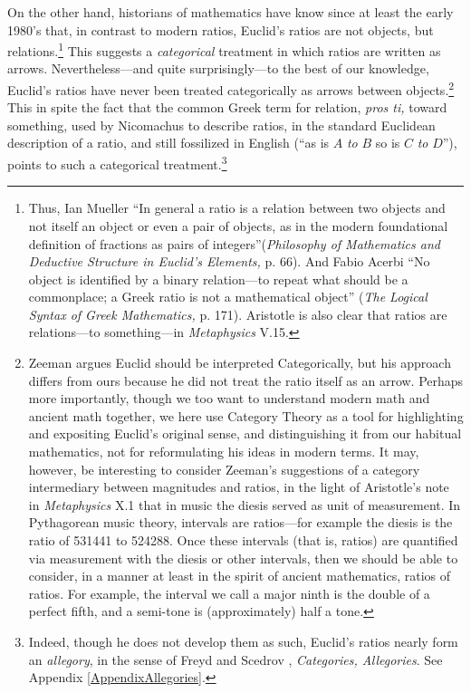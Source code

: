 \documentclass[11pt]{article}
\begin{document}
On the other hand, historians of mathematics have know since at least the early 1980's that, in contrast to modern ratios, Euclid's ratios are not objects, but relations.\footnote{Thus, Ian Mueller \protect\citep{mueller1981} ``In general a ratio is a relation between two objects and not itself an object or even a pair of objects, as in the modern foundational definition of fractions as pairs of integers''(\textit{Philosophy of Mathematics and Deductive Structure in
Euclid's \emph{Elements,}} p. 66). And Fabio Acerbi \protect\citep{acerbi2021} ``No object is identified by a binary relation---to repeat what should be a commonplace; a Greek ratio is not a mathematical object'' (\textit{The Logical Syntax of Greek Mathematics,} p. 171). Aristotle \cite{aristotle-meta} is also clear that ratios are relations---to something---in \textit{Metaphysics} V.15.} This suggests a \textit{categorical} treatment  in which ratios are written as arrows. Nevertheless---and quite surprisingly---to the best of our knowledge, Euclid's ratios have never been treated categorically as arrows between objects.\footnote{Zeeman \citep{zeeman1977} argues Euclid should be interpreted Categorically, but his approach differs from ours because he did not treat the ratio itself as an arrow. Perhaps more importantly, though we too want to understand modern math and ancient math together, we here use Category Theory as a tool for highlighting and expositing Euclid's original sense, and distinguishing it from our habitual mathematics, not for reformulating his ideas in modern terms. It may, however, be interesting to consider Zeeman's suggestions of a category intermediary between magnitudes and ratios, in the light of Aristotle's note in \textit{Metaphysics} X.1 that in music the diesis served as unit of measurement. In Pythagorean music theory, intervals are ratios---for example the diesis is the ratio of 531441 to 524288. Once these intervals (that is, ratios) are quantified via measurement with the diesis or other intervals, then we should be able to consider, in a manner at least in the spirit of ancient mathematics, ratios of ratios. For example, the interval we call a major ninth is the double of a perfect fifth, and a semi-tone is (approximately) half a tone.} This in spite the fact that the common Greek term for relation, \textit{pros ti,} toward something, used by Nicomachus to describe ratios, in the standard Euclidean description of a ratio, and still fossilized in English (``as is $A$ \textit{to} $B$ so is $C$ \textit{to} $D$''), points to such a categorical treatment.\footnote{Indeed, though he does not develop them as such, Euclid's ratios nearly form an \textit{allegory}, in the sense of Freyd and Scedrov \protect\citep{freyd-scedrov1990}, \textit{Categories, Allegories}. See Appendix \ref{AppendixAllegories}.}
\end{document}
